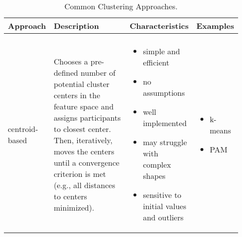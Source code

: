 \begin{sidewaystable*}[!hbtp]
    \centering
    \caption{Common Clustering Approaches.}
    \label{tab:clusterApproaches} 
    \begin{tabular}{
    >{\raggedright\arraybackslash}p{0.15\linewidth} 
    >{\raggedright\arraybackslash}p{0.40\linewidth} 
    >{\raggedright\arraybackslash}p{0.28\linewidth} 
    >{\raggedright\arraybackslash}p{0.12\linewidth}
    }
        \hline 
        Approach & Description & Characteristics & Examples \\ 
        \hline \\ [-0.5em]
        
        centroid-based \linebreak & 
        Chooses a pre-defined number of potential cluster centers in the feature space and assigns participants to closest center. Then, iteratively, moves the centers until a convergence criterion is met (e.g., all distances to centers minimized).
        \linebreak &
        \vspace{-1em}
        \begin{itemize}[nosep,leftmargin=*,label={--}]
            \item[\scriptsize\faPlusCircle] simple and efficient
            \item[\scriptsize\faPlusCircle] no assumptions
            \item[\scriptsize\faPlusCircle] well implemented
            \item[\scriptsize\faMinusCircle] may struggle with complex shapes
            \item[\scriptsize\faMinusCircle] sensitive to initial values and outliers
        \end{itemize}\linebreak & 
        \vspace{-1em}
        \begin{itemize}[nosep,leftmargin=*,label={--}]
            \item k-means
            \item PAM
        \end{itemize}\linebreak \\ 
        

\end{tabular}
\end{sidewaystable*}
